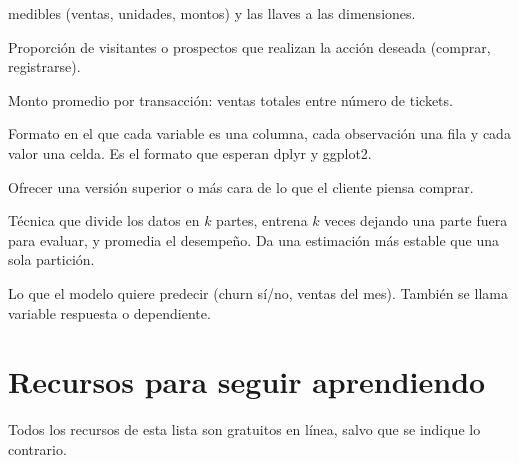 \begin{description}[style=nextline, leftmargin=1.2em, itemsep=0.35em]
  medibles (ventas, unidades, montos) y las llaves a las dimensiones.
\item[Tasa de conversión] Proporción de visitantes o prospectos que
  realizan la acción deseada (comprar, registrarse).
\item[Ticket promedio] Monto promedio por transacción: ventas totales entre
  número de tickets.
\item[Tidy data (datos ordenados)] Formato en el que cada variable es una
  columna, cada observación una fila y cada valor una celda. Es el formato
  que esperan dplyr y ggplot2.
\item[Up-selling] Ofrecer una versión superior o más cara de lo que el
  cliente piensa comprar.
\item[Validación cruzada] Técnica que divide los datos en $k$ partes,
  entrena $k$ veces dejando una parte fuera para evaluar, y promedia el
  desempeño. Da una estimación más estable que una sola partición.
\item[Variable objetivo] Lo que el modelo quiere predecir (churn sí/no,
  ventas del mes). También se llama variable respuesta o dependiente.
\end{description}

\section{Recursos para seguir aprendiendo}
\label{sec:ap-b-recursos}

Todos los recursos de esta lista son gratuitos en línea, salvo que se
indique lo contrario.

